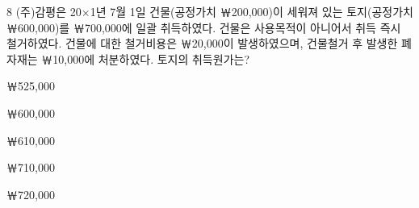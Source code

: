 \begin{question}{8}
(주)감평은 20×1년 7월 1일 건물(공정가치 ￦200,000)이 세워져 있는 토지(공정가치 ￦600,000)를 ￦700,000에 일괄 취득하였다. 건물은 사용목적이 아니어서 취득 즉시 철거하였다. 건물에 대한 철거비용은 ￦20,000이 발생하였으며, 건물철거 후 발생한 폐자재는 ￦10,000에 처분하였다. 토지의 취득원가는?
\begin{choices}
  \item ￦525,000
  \item ￦600,000
  \item ￦610,000
  \item ￦710,000
  \item ￦720,000
\end{choices}
\end{question}
